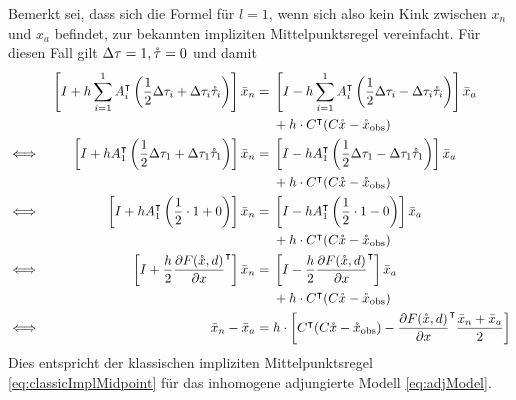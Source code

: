 Bemerkt sei, dass sich die Formel für $l=1$, wenn sich also kein Kink zwischen $x_n$ und $x_a$ befindet, zur bekannten impliziten Mittelpunktsregel vereinfacht. Für diesen Fall gilt $\Delta \tau =1,\mathring{\tau} = 0$ und damit
\begin{align*}
&& \left[I +h\sum_{i=1}^1 A_i^\intercal \left(\frac{1}{2} \Delta \tau_i +\Delta \tau_i \mathring{\tau}_i\right) \right]\bar{x}_n &=\begin{aligned}[t]
   & \left[I - h\sum_{i=1}^1 A_i^\intercal  \left(\frac{1}{2}\Delta \tau_i-\Delta \tau_i \mathring{\tau}_i\right)\right]\bar{x}_a  \\
	&+	h\cdot C^\intercal(C\mathring{x} -\mathring{x}_{\text{obs}}) 
       \end{aligned} \\
\iff &&  \left[I +h A_1^\intercal \left(\frac{1}{2} \Delta \tau_1 +\Delta \tau_1 \mathring{\tau}_1\right) \right]\bar{x}_n &= 
  \begin{aligned}[t]	
&\left[I - h A_1^\intercal  \left(\frac{1}{2}\Delta \tau_1-\Delta \tau_1 \mathring{\tau}_1\right)\right]\bar{x}_a  \\
&+h\cdot C^\intercal(C\mathring{x} -\mathring{x}_{\text{obs}})
  \end{aligned} \\
\iff &&  \left[I +h A_1^\intercal \left(\frac{1}{2} \cdot 1+0\right) \right]\bar{x}_n &= \begin{aligned}[t]
&\left[I - h A_1^\intercal  \left(\frac{1}{2} \cdot 1-0\right)\right]\bar{x}_a \\
&+h\cdot C^\intercal(C\mathring{x} -\mathring{x}_{\text{obs}})                                                                                  
\end{aligned}\\
\iff &&  \left[ I +\frac{h}{2} \frac{\partial F(\mathring{x} ,d)}{\partial x}^\intercal \right]\bar{x}_n &= 
\begin{aligned}[t]
&\left[ I - \frac{h}{2}  \frac{\partial F(\mathring{x} ,d)}{\partial x}^\intercal  \right]\bar{x}_a \\
&+h\cdot C^\intercal(C\mathring{x} -\mathring{x}_{\text{obs}})\\
\end{aligned}\\
\iff &&  \bar{x}_n - \bar{x}_a &=h\cdot \left[C^\intercal(C\mathring{x} -\mathring{x}_{\text{obs}}) - \frac{\partial F(\mathring{x} ,d)}{\partial x}^\intercal  \frac{\bar{x}_n + \bar{x}_a}{2}\right]\\
\end{align*}
Dies entspricht der klassischen impliziten Mittelpunktsregel \eqref{eq:classicImplMidpoint} für das inhomogene adjungierte Modell \eqref{eq:adjModel}.

 

 
